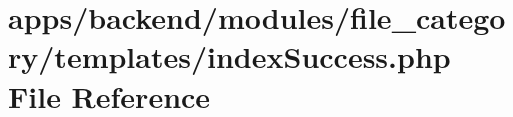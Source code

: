 \hypertarget{backend_2modules_2file__category_2templates_2index_success_8php}{\section{apps/backend/modules/file\-\_\-category/templates/index\-Success.php File Reference}
\label{backend_2modules_2file__category_2templates_2index_success_8php}
}
